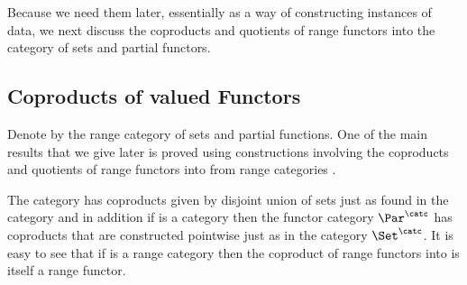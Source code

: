 

 Because we need them later, essentially as a way of constructing 
 instances of data, we next discuss the coproducts and quotients of range functors into the category of sets and partial functors.

\subsection{Coproducts of \Par valued  Functors}
Denote by \Par the range category of sets and partial functions.
One of the main results that we give later is proved using constructions involving the coproducts and quotients of range functors into \Par from range categories \catcw. 

The category \Par has coproducts given by disjoint union of sets just as found in the category \Set and in addition if  \catcw is a category
then the functor category $\Par^\catc$  has coproducts that are constructed pointwise just as in the category $\Set^\catc$. It is easy to see that
if \catcw is a range category then the coproduct of range functors into \Par 
is itself a range functor.

